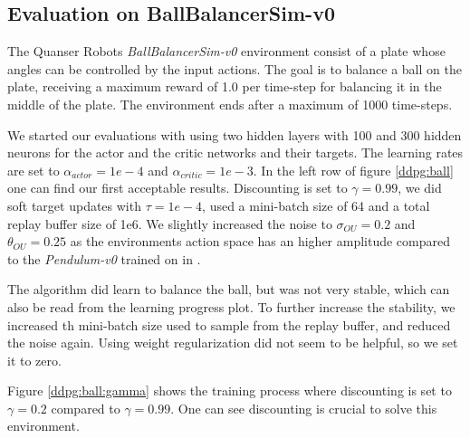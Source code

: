 \subsection{Evaluation on BallBalancerSim-v0}
The Quanser Robots \textit{BallBalancerSim-v0} environment consist of a plate whose angles can be controlled by the input actions. The goal is to balance a ball on the plate, receiving a maximum reward of 1.0 per time-step for balancing it in the middle of the plate. The environment ends after a maximum of 1000 time-steps.

We started our evaluations with using two hidden layers with 100 and 300 hidden neurons for the actor and the critic networks and their targets. The learning rates are set to $\alpha_{actor}=1e-4$ and $\alpha_{critic}=1e-3$.  In the left row of figure \ref{ddpg:ball} one can find our first acceptable results. Discounting is set to $\gamma=0.99$, we did soft target updates with $\tau=1e-4$, used a mini-batch size of 64 and a total replay buffer size of 1e6. We slightly increased the noise to $\sigma_{OU}=0.2$ and $\theta_{OU}=0.25$ as the environments action space has an higher amplitude compared to the \textit{Pendulum-v0} trained on in \citep{lillicrap2015continuous}.

The algorithm did learn to balance the ball, but was not very stable, which can also be read from the learning progress plot. To further increase the stability, we increased th mini-batch size used to sample from the replay buffer, and reduced the noise again. Using weight regularization did not seem to be helpful, so we set it to zero.

Figure \ref{ddpg:ball:gamma} shows the training process where discounting is set to $\gamma=0.2$ compared to $\gamma=0.99$. One can see discounting is crucial to solve this environment.

